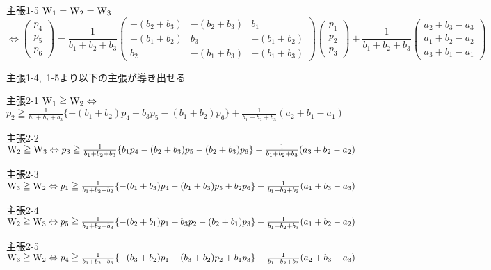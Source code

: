 \documentclass[11pt]{jarticle} %
\begin{document}
\begin{itembox}[l]{主張1-5}
${\rm W_{1}}={\rm W_{2}}={\rm W_{3}} $
{\scriptsize \[\Leftrightarrow
\left(
\begin{array}{c}
p_4 \\
p_5 \\
p_6
\end{array}
\right)
=
\frac{1}{b_1+b_2+b_3}
\left(
\begin{array}{ccc}
-(b_2+b_3) & -(b_2+b_3) & b_1 \\
-(b_1+b_2) & b_3 & -(b_1+b_2) \\
b_2 & -(b_1+b_3) & -(b_1+b_3)
\end{array}
\right)
\left(
\begin{array}{c}
p_1 \\
p_2 \\
p_3
\end{array}
\right)
+
\frac{1}{b_1+b_2+b_3}
\left(
\begin{array}{c}
a_2+b_3-a_3 \\
a_1+b_2-a_2 \\
a_3+b_1-a_1
\end{array}
\right)
\]}
\end{itembox}
主張1-4,~1-5より以下の主張が導き出せる

\begin{itembox}[l]{主張2-1}
${\rm W_{1}} \geqq {\rm W_{2}}\Leftrightarrow $
$p_2 \geqq \frac{1}{b_1+b_2+b_3}\{-(b_1+b_2)p_4+b_3p_5-(b_1+b_2)p_6\}+\frac{1}{b_1+b_2+b_3}(a_2+b_1-a_1)$
\end{itembox}

\begin{itembox}[l]{主張2-2}
${\rm W_{2}}\geqq{\rm W_{3}}\Leftrightarrow p_3\geqq\frac{1}{b_1+b_2+b_3}\{b_1p_4-(b_2+b_3)p_5-(b_2+b_3)p_6\}+\frac{1}{b_1+b_2+b_3}(a_3+b_2-a_2)$
\end{itembox}
\begin{itembox}[l]{主張2-3}
${\rm W_{3}}\geqq{\rm W_{2}}\Leftrightarrow p_1\geqq\frac{1}{b_1+b_2+b_3}\{-(b_1+b_3)p_4-(b_1+b_3)p_5+b_2p_6\}+\frac{1}{b_1+b_2+b_3}(a_1+b_3-a_3)$
\end{itembox}


\begin{itembox}[l]{主張2-4}
${\rm W_{2}}\geqq{\rm W_{3}}\Leftrightarrow p_5\geqq\frac{1}{b_1+b_2+b_3}\{-(b_2+b_1)p_1+b_3p_2-(b_2+b_1)p_3\}+\frac{1}{b_1+b_2+b_3}(a_1+b_2-a_2)$
\end{itembox}

\begin{itembox}[l]{主張2-5}
${\rm W_{3}}\geqq{\rm W_{2}}\Leftrightarrow p_4\geqq\frac{1}{b_1+b_2+b_3}\{-(b_3+b_2)p_1-(b_3+b_2)p_2+b_1p_3\}+\frac{1}{b_1+b_2+b_3}(a_2+b_3-a_3)$
\end{itembox}
\end{document}
